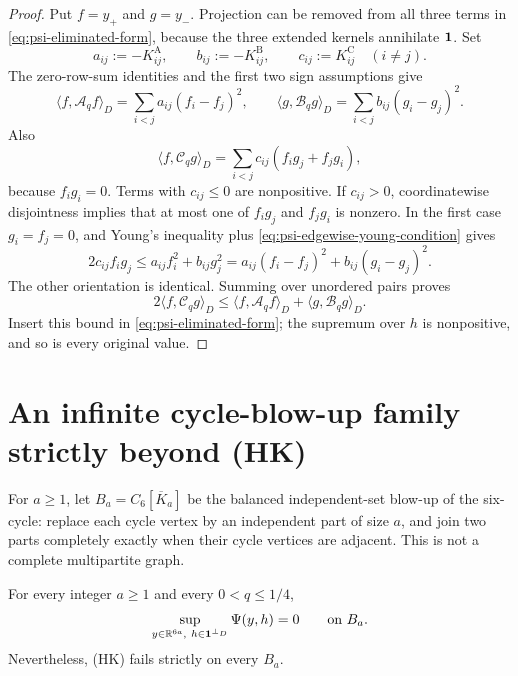 \documentclass[11pt]{article}
\begin{document}
\begin{proof}
Put $f=y_+$ and $g=y_-$.  Projection can be removed from all three terms in
\cref{eq:psi-eliminated-form}, because the three extended kernels annihilate
$\mathbf{1}$.  Set
\begin{equation*}
 a_{ij}:=-K^{\mathrm A}_{ij},
 \qquad b_{ij}:=-K^{\mathrm B}_{ij},
 \qquad c_{ij}:=K^{\mathrm C}_{ij}
 \quad(i\neq j).
\end{equation*}
The zero-row-sum identities and the first two sign assumptions give
\begin{equation*}
 \langle f,\mathcal A_qf\rangle_D
 =\sum_{i<j}a_{ij}(f_i-f_j)^2,
 \qquad
 \langle g,\mathcal B_qg\rangle_D
 =\sum_{i<j}b_{ij}(g_i-g_j)^2.
\end{equation*}
Also
\begin{equation*}
 \langle f,\mathcal C_qg\rangle_D
 =\sum_{i<j}c_{ij}(f_ig_j+f_jg_i),
\end{equation*}
because $f_ig_i=0$.  Terms with $c_{ij}\leq0$ are nonpositive.  If
$c_{ij}>0$, coordinatewise disjointness implies that at most one of
$f_ig_j$ and $f_jg_i$ is nonzero.  In the first case $g_i=f_j=0$, and
Young's inequality plus \cref{eq:psi-edgewise-young-condition} gives
\begin{equation*}
 2c_{ij}f_ig_j
 \leq a_{ij}f_i^2+b_{ij}g_j^2
 =a_{ij}(f_i-f_j)^2+b_{ij}(g_i-g_j)^2.
\end{equation*}
The other orientation is identical.  Summing over unordered pairs proves
\begin{equation*}
 2\langle f,\mathcal C_qg\rangle_D
 \leq
 \langle f,\mathcal A_qf\rangle_D
 +\langle g,\mathcal B_qg\rangle_D.
\end{equation*}
Insert this bound in \cref{eq:psi-eliminated-form}; the supremum over $h$ is
nonpositive, and so is every original value.
\end{proof}

\section{An infinite cycle-blow-up family strictly beyond \textup{(HK)}}

For $a\geq1$, let $B_a=C_6[\overline K_a]$ be the balanced independent-set
blow-up of the six-cycle: replace each cycle vertex by an independent part
of size $a$, and join two parts completely exactly when their cycle
vertices are adjacent.  This is not a complete multipartite graph.

\begin{theorem}
\label{thm:psi-c6-blowup}
For every integer $a\geq1$ and every $0<q\leq1/4$,
\begin{equation}
 \sup_{y\in\mathbb R^{6a},\ h\in\one^{\perp_D}}\Psi(y,h)=0
 \qquad\text{on }B_a.
 \label{eq:psi-c6-blowup-sup}
\end{equation}
Nevertheless, \textup{(HK)} fails strictly on every $B_a$.
\end{theorem}
\end{document}
